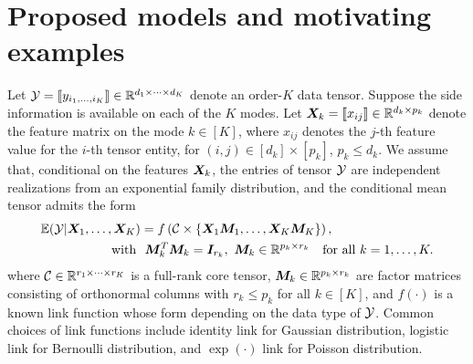 \documentclass{article}
\theoremstyle{definition}
\theoremstyle{definition}
\begin{document}




\section{Proposed models and motivating examples}
Let $\mathcal{Y}=\llbracket y_{i_1,\ldots,i_K} \rrbracket\in\mathbb{R}^{d_1\times \cdots\times d_K}$ denote an order-$K$ data tensor. Suppose the side information is available on each of the $K$ modes. Let $\bm X_k=\llbracket x_{ij} \rrbracket\in\mathbb{R}^{d_k\times p_k}$ denote the feature matrix on the mode $k\in[K]$, where $x_{ij}$ denotes the $j$-th feature value for the $i$-th tensor entity, for $(i,j)\in[d_k]\times[p_k]$, $p_k\leq d_k$. We assume that, conditional on the features $\bm X_k$, the entries of tensor $\mathcal{Y}$ are independent realizations from an exponential family distribution, and the conditional mean tensor admits the form
\begin{align}\label{eq:decomp}
\mathbb{E}(\tY|\mX_1,\ldots,\mX_K) &= f\left(\tC\times\{\mX_1\mM_1, \ldots, \mX_K\mM_K\}\right),\notag\\
\text{with} \ &\ \mM_k^T\mM_k = \mI_{r_k},\ \mM_k\in\mathbb{R}^{p_k\times r_k}\quad \text{for all }k=1,\ldots,K.
\end{align}
where $\mathcal{C}\in\mathbb{R}^{r_1\times \cdots \times r_K}$ is a full-rank core tensor, $\bm M_k\in\mathbb{R}^{p_k\times r_k}$ are factor matrices consisting of orthonormal columns with $r_k\leq p_k$ for all $k\in[K]$, and $f(\cdot)$ is a known link function whose form depending on the data type of $\mathcal{Y}$. Common choices of link functions include identity link for Gaussian distribution, logistic link for Bernoulli distribution, and $\exp(\cdot)$ link for Poisson distribution. 
\end{document}
